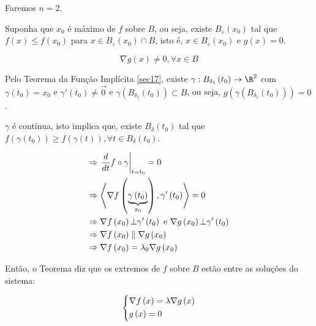 \documentclass[11pt, oneside, a4paper]{gsm-l}
\begin{document}
\begin{dem}
Faremos $n = 2$.

    Suponha que $x_0$ é máximo de $f$ sobre $B$, ou seja, existe $B_\varepsilon  \left( {x_0 } \right)$ tal que $f\left( x \right) \leqslant f\left( {x_0 } \right)$ para $x \in B_\varepsilon  \left( {x_0 } \right) \cap B$, isto é, $x \in B_\varepsilon  \left( {x_0 } \right)$ e $g(x) = 0$.

\[
\nabla g\left( x \right) \ne 0,\forall x \in B
\]

    Pelo Teorema da Função Implícita \ref{sec17}, existe $\gamma :B_{\delta _1 } \left( {t_0 } \right) \to \R^2$ com $\gamma \left( {t_0 } \right) = x_0$ e $\gamma '\left( {t_0 } \right) \ne \overrightarrow 0$ e $\gamma \left( {B_{\delta _1 } \left( {t_0 } \right)} \right) \subset B$, ou seja, $g\left( {\gamma \left( {B_{\delta _1 } \left( {t_0 } \right)} \right)} \right) = 0$.

    $\gamma$ é contínua, isto implica que, existe $B_\delta  \left( {t_0 } \right)$ tal que $f\left( {\gamma \left( {t_0 } \right)} \right) \geqslant f\left( {\gamma \left( t \right)} \right),\forall t \in B_\delta  \left( {t_0 } \right)$.

\[
\begin{gathered}
\Rightarrow \left. {\frac{d}
{{dt}}f \circ \gamma } \right|_{t = t_0 }  = 0 \hfill \\
   \Rightarrow \left\langle {\nabla f\left( {\underbrace {\gamma \left( {t_0 } \right)}_{x_0 }} \right),\gamma '\left( {t_0 } \right)} \right\rangle  = 0 \hfill \\
   \Rightarrow \nabla f\left( {x_0 } \right) \bot \gamma '\left( {t_0 } \right){\text{ e }}\nabla g\left( {x_0 } \right) \bot \gamma '\left( {t_0 } \right) \hfill \\
   \Rightarrow \nabla f\left( {x_0 } \right)\parallel \nabla g\left( {x_0 } \right) \hfill \\
   \Rightarrow \nabla f\left( {x_0 } \right) = \lambda _0 \nabla g\left( {x_0 } \right) \hfill \\
\end{gathered}
\]

\end{dem}


Então, o Teorema diz que os extremos de $f$ sobre $B$ estão entre as soluções do sistema:

\[
\left\{ \begin{gathered}
\nabla f\left( x \right) = \lambda \nabla g\left( x \right) \hfill \\
g\left( x \right) = 0 \hfill \\
\end{gathered}  \right.
\]
\end{document}
